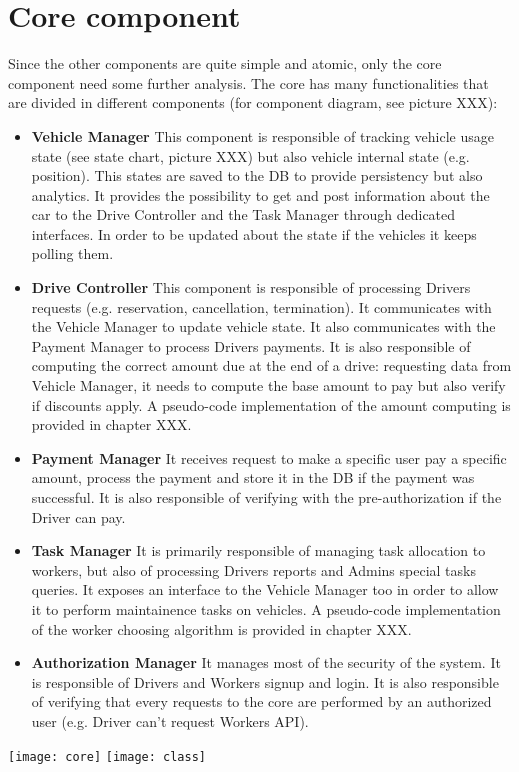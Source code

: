 \section {Core component}
Since the other components are quite simple and atomic, only the core component need some further analysis. The core has many functionalities that are divided in different components (for component diagram, see picture XXX):
\begin{itemize}
\item \textbf{Vehicle Manager} This component is responsible of tracking vehicle usage state (see state chart, picture XXX) but also vehicle internal state (e.g. position). This states are saved to the DB to provide persistency but also analytics. It provides the possibility to get and post information about the car to the Drive Controller and the Task Manager through dedicated interfaces. In order to be updated about the state if the vehicles it keeps polling them.
\item \textbf{Drive Controller} This component is responsible of processing Drivers requests (e.g. reservation, cancellation, termination). It communicates with the Vehicle Manager to update vehicle state. It also communicates with the Payment Manager to process Drivers payments. It is also responsible of computing the correct amount due at the end of a drive: requesting data from Vehicle Manager, it needs to compute the base amount to pay but also verify if discounts apply. A pseudo-code implementation of the amount computing is provided in chapter XXX.
\item \textbf{Payment Manager} It receives request to make a specific user pay a specific amount, process the payment and store it in the DB if the payment was successful. It is also responsible of verifying with the pre-authorization if the Driver can pay. 
\item \textbf{Task Manager} It is primarily responsible of managing task allocation to workers, but also of processing Drivers reports and Admins special tasks queries. It exposes an interface to the Vehicle Manager too in order to allow it to perform maintainence tasks on vehicles. A pseudo-code implementation of the worker choosing algorithm is provided in chapter XXX.
\item \textbf{Authorization Manager} It manages most of the security of the system. It is responsible of Drivers and Workers signup and login. It is also responsible of verifying that every requests to the core are performed by an authorized user (e.g. Driver can't request Workers API). 
\end{itemize}

\texttt{[image: core]}
\texttt{[image: class]}

